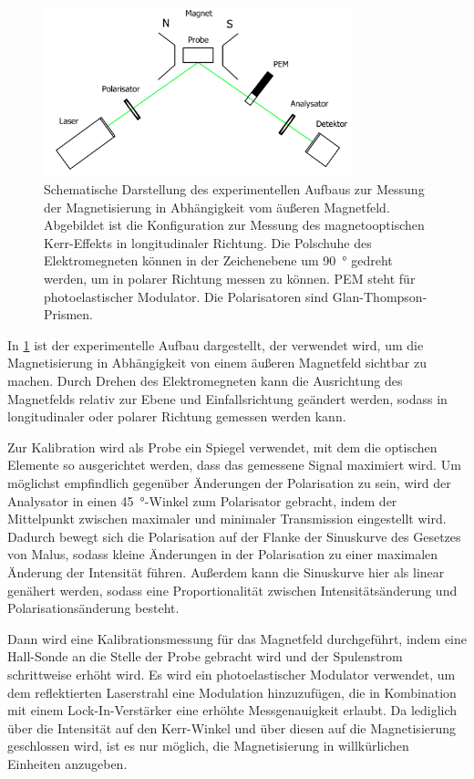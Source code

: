   \begin{figure}[H]
      \centering
      \includegraphics[width=0.8\textwidth]{img/setup2}
      \caption{Schematische Darstellung des experimentellen Aufbaus zur Messung der Magnetisierung in Abhängigkeit vom äußeren Magnetfeld. Abgebildet ist die Konfiguration zur Messung des magnetooptischen Kerr-Effekts in longitudinaler Richtung. Die Polschuhe des Elektromegneten können in der Zeichenebene um \SI{90}{\degree} gedreht werden, um in polarer Richtung messen zu können. PEM steht für photoelastischer Modulator. Die Polarisatoren sind Glan-Thompson-Prismen.}
      \label{fig_setup2}
  \end{figure}

  In \cref{fig_setup2} ist der experimentelle Aufbau dargestellt, der verwendet wird, um die Magnetisierung in Abhängigkeit von einem äußeren Magnetfeld sichtbar zu machen.
  Durch Drehen des Elektromegneten kann die Ausrichtung des Magnetfelds relativ zur Ebene und Einfallsrichtung geändert werden, sodass in longitudinaler oder polarer Richtung gemessen werden kann.

  Zur Kalibration wird als Probe ein Spiegel verwendet, mit dem die optischen Elemente so ausgerichtet werden, dass das gemessene Signal maximiert wird.
  Um möglichst empfindlich gegenüber Änderungen der Polarisation zu sein, wird der Analysator in einen \SI{45}{\degree}-Winkel zum Polarisator gebracht, indem der Mittelpunkt zwischen maximaler und minimaler Transmission eingestellt wird.
  Dadurch bewegt sich die Polarisation auf der Flanke der Sinuskurve des Gesetzes von Malus, sodass kleine Änderungen in der Polarisation zu einer maximalen Änderung der Intensität führen.
  Außerdem kann die Sinuskurve hier als linear genähert werden, sodass eine Proportionalität zwischen Intensitätsänderung und Polarisationsänderung besteht.

  Dann wird eine Kalibrationsmessung für das Magnetfeld durchgeführt, indem eine Hall-Sonde an die Stelle der Probe gebracht wird und der Spulenstrom schrittweise erhöht wird.
  Es wird ein photoelastischer Modulator verwendet, um dem reflektierten Laserstrahl eine Modulation hinzuzufügen, die in Kombination mit einem Lock-In-Verstärker eine erhöhte Messgenauigkeit erlaubt.
  Da lediglich über die Intensität auf den Kerr-Winkel und über diesen auf die Magnetisierung geschlossen wird, ist es nur möglich, die Magnetisierung in willkürlichen Einheiten anzugeben.

